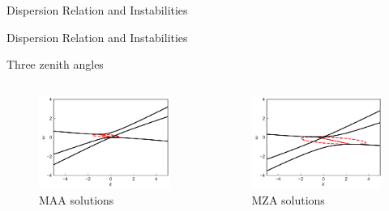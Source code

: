 \documentclass[9pt]{beamer}
\begin{document}
\begin{darkframes}
\begin{frame}{Dispersion Relation and Instabilities}
\end{frame}



\begin{frame}{Dispersion Relation and Instabilities}

\centering
      Three zenith angles

   \begin{columns}[T]

\begin{column}{0.5\textwidth}
   \begin{figure}
     \includegraphics[width=\linewidth]{assets/dr/spectDB3WC4DRDBMAAPltBlob.pdf}
     \caption*{MAA solutions}
  \end{figure}
\end{column}

\begin{column}{0.5\textwidth}
   \begin{figure}
      \includegraphics[width=\linewidth]{assets/dr/spectDB3WC4DRDBMZAPltBlob.pdf}
      \caption*{ MZA solutions}
   \end{figure}
\end{column}


\end{columns}
\end{frame}
\end{darkframes}
\end{document}
